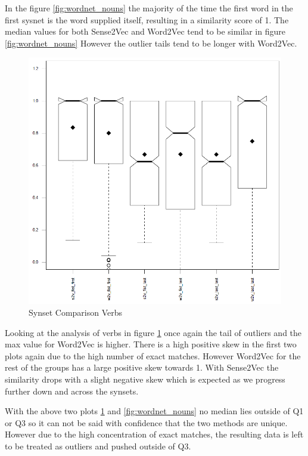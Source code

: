 \noindent
In the figure \ref{fig:wordnet_nouns} the majority of the time the first word in the first sysnet is the word supplied itself, resulting in a similarity score of 1. The median values for both Sense2Vec and Word2Vec tend to be similar in figure \ref{fig:wordnet_nouns} However the outlier tails tend to be longer with Word2Vec.

\begin{figure}[H]
\centering
  \includegraphics[width=\textwidth]{images/wordnet_verbs.PNG}
  \caption{Synset Comparison Verbs}
  \label{fig:wordnet_verbs}
\end{figure}

\noindent
Looking at the analysis of verbs in figure \ref{fig:wordnet_verbs} once again the tail of outliers and the max value for Word2Vec is higher. There is a high positive skew in the first two plots again due to the high number of exact matches. However Word2Vec for the rest of the groups has a large positive skew towards 1. With Sense2Vec the similarity drops with a slight negative skew which is expected as we progress further down and across the synsets.

With the above two plots \ref{fig:wordnet_verbs} and \ref{fig:wordnet_nouns} no median lies outside of Q1 or Q3 so it can not be said with confidence that the two methods are unique. However due to the high concentration of exact matches, the resulting data is left to be treated as outliers and pushed outside of Q3.

